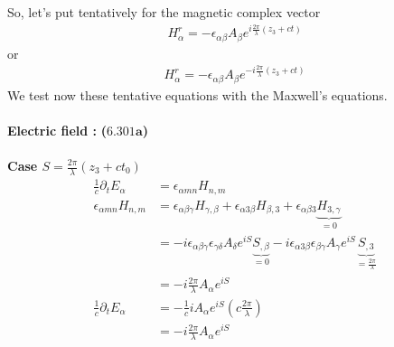 So, let's put tentatively for the magnetic complex vector
\begin{align}
H^r_{\alpha}=-\epsilon_{\alpha\beta}A_{\beta}e^{i\frac{2\pi}{\lambda}\left(z_3+ct\right)}
\end{align}
or 
\begin{align}
H^r_{\alpha}=-\epsilon_{\alpha\beta}A_{\beta}e^{-i\frac{2\pi}{\lambda}\left(z_3+ct\right)}
\end{align}
We test now these tentative equations with the Maxwell's equations.\\\\ 
\textbf{Electric field :} \textbf{($\mathbf{6.301a}$)}\\\\
\textbf{Case $S= \frac{2\pi}{\lambda}\left(z_3+ct_0\right)$}
\begin{align}
\frac{1}{c}\partial_t E_{\alpha}&=\epsilon_{\alpha mn}H_{n,m}\\
\epsilon_{\alpha mn}H_{n,m}&= \epsilon_{\alpha\beta\gamma}H_{\gamma,\beta}+\epsilon_{\alpha 3\beta}H_{\beta,3}+\epsilon_{\alpha\beta 3}\underbrace{H_{3,\gamma}}_{=0}\\
&= -i\epsilon_{\alpha\beta\gamma}\epsilon_{\gamma\delta}A_{\delta}e^{iS}\underbrace{S_{,\beta}}_{=0}-i\epsilon_{\alpha 3 \beta}\epsilon_{\beta \gamma}A_{\gamma}e^{iS}\underbrace{S_{,3}}_{=\frac{2\pi}{\lambda}}\\
&= -i\frac{2\pi}{\lambda}A_{\alpha}e^{iS}\\
\frac{1}{c}\partial_t E_{\alpha}&=-\frac{1}{c}iA_{\alpha}e^{iS}\left(c\frac{2\pi}{\lambda}\right)\\
&=-i\frac{2\pi}{\lambda}A_{\alpha}e^{iS}
\end{align}

